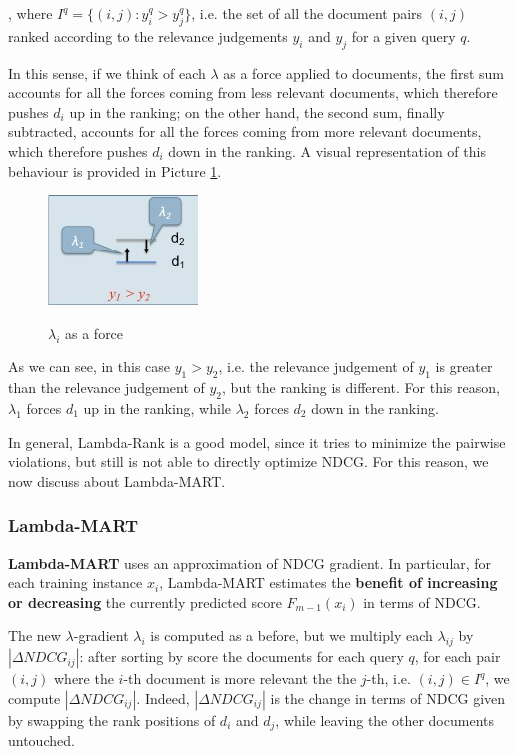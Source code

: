 , where $I^q = \{ (i,j) : y_i^q > y_j^q \}$, i.e. the set of all the document pairs $(i,j)$ ranked according to the relevance judgements $y_i$ and $y_j$ for a given query $q$. 

In this sense, if we think of each $\lambda$ as a force applied to documents, the first sum accounts for all the forces coming from less relevant documents, which therefore pushes $d_i$ up in the ranking; on the other hand, the second sum, finally subtracted, accounts for all the forces coming from more relevant documents, which therefore pushes $d_i$ down in the ranking. A visual representation of this behaviour is provided in Picture \ref{forces}.

\begin{figure}[h!]
		\centering
        \includegraphics[scale = 2.5]{img/forces.jpg}
		\label{forces}
        \caption{$\lambda_i$ as a force}
\end{figure}

As we can see, in this case $y_1 > y_2$, i.e. the relevance judgement of $y_1$ is greater than the relevance judgement of $y_2$, but the ranking is different. For this reason, $\lambda_1$ forces $d_1$ up in the ranking, while $\lambda_2$ forces $d_2$ down in the ranking.

In general, Lambda-Rank is a good model, since it tries to minimize the pairwise violations, but still is not able to directly optimize NDCG. For this reason, we now discuss about Lambda-MART.

\subsubsection{Lambda-MART}
\textbf{Lambda-MART} uses an approximation of NDCG gradient. In particular, for each training instance $x_i$, Lambda-MART estimates the \textbf{benefit of increasing or decreasing} the currently predicted score $F_{m-1}(x_i)$ in terms of NDCG.

The new $\lambda$-gradient $\lambda_i$ is computed as a before, but we multiply each $\lambda_{ij}$ by $|\Delta NDCG_{ij}|$: after sorting by score the documents for each query $q$, for each pair $(i,j)$ where the $i$-th document is more relevant the the $j$-th, i.e. $(i,j) \in I^q$, we compute $|\Delta NDCG_{ij}|$. Indeed, $|\Delta NDCG_{ij}|$ is the change in terms of NDCG given by swapping the rank positions of $d_i$ and $d_j$, while leaving the other documents untouched.

